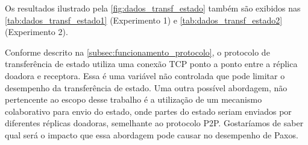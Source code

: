Os resultados ilustrado pela \autoref{fig:dados_transf_estado} também são exibidos nas
\autoref{tab:dados_transf_estado1} (Experimento 1) e \autoref{tab:dados_transf_estado2}
(Experimento 2).

\begin{table}[htb]
\end{table}

\begin{table}[htb]
\end{table}

Conforme descrito na \autoref{subsec:funcionamento_protocolo}, o protocolo de
transferência de estado utiliza uma conexão TCP ponto a ponto entre a réplica doadora e
receptora. Essa é uma variável não controlada que pode limitar o desempenho da
transferência de estado. Uma outra possível abordagem, não pertencente ao escopo desse
trabalho é a utilização de um mecanismo colaborativo para envio do estado, onde partes do
estado seriam enviados por diferentes réplicas doadoras, semelhante ao protocolo P2P.
Gostaríamos de saber qual será o impacto que essa abordagem pode causar no desempenho de
Paxos.

